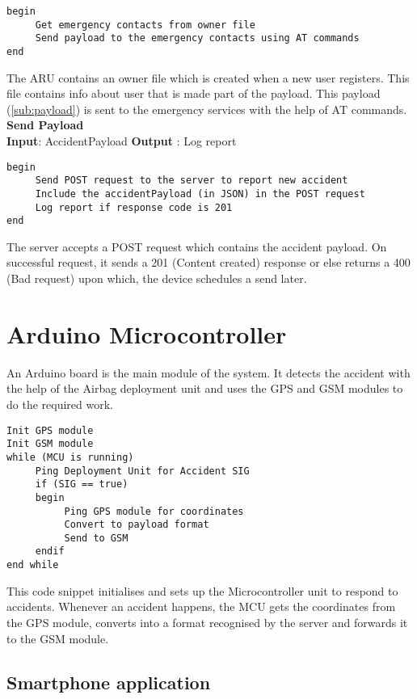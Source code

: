 \begin{verbatim}
begin
     Get emergency contacts from owner file
     Send payload to the emergency contacts using AT commands
end 
\end{verbatim} 

The ARU contains an owner file which is created when a new user registers. This file contains info about user that is made part of the payload. This payload (\ref{sub:payload}) is sent to the emergency services with the help of AT commands. \\

\noindent\textbf{Send Payload} \\
\noindent\textbf{Input}: AccidentPayload \newline
\textbf{Output} : Log report

\begin{verbatim}
begin
     Send POST request to the server to report new accident
     Include the accidentPayload (in JSON) in the POST request
     Log report if response code is 201
end 
\end{verbatim}

The server accepts a POST request which contains the accident payload. On successful request, it sends a 201 (Content created) response or else returns a 400 (Bad request) upon which, the device schedules a send later. 

\section{Arduino Microcontroller}

An Arduino board is the main module of the system. It detects the accident with the help of the Airbag deployment unit and uses the GPS and GSM modules to do the required work.

\begin{verbatim}
Init GPS module
Init GSM module
while (MCU is running)
     Ping Deployment Unit for Accident SIG
     if (SIG == true)
     begin
          Ping GPS module for coordinates
          Convert to payload format
          Send to GSM
     endif
end while
\end{verbatim}

This code snippet initialises and sets up the Microcontroller unit to respond to accidents. Whenever an accident happens, the MCU gets the coordinates from the GPS module, converts into a format recognised by the server and forwards it to the GSM module.

\subsection{Smartphone application}

